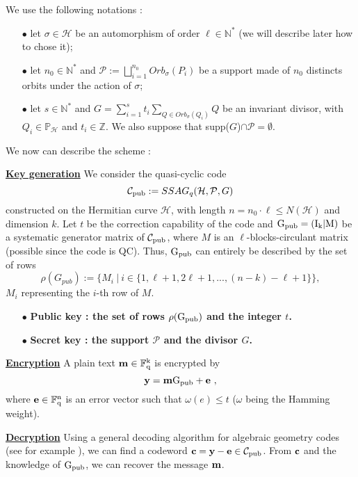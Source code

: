 \documentclass[10pt]{article}
\newcommand{\s}{\vspace{0.3cm}}
\newcommand{\cd}{\cdot}
\newcommand{\N}{\mathbb{N}}
\newcommand{\Z}{\mathbb{Z}}
\newcommand{\PP}{\mathbb{P}}
\newcommand{\fq}{\mathbb{F}_q}
\newcommand{\w}{\omega}
\newcommand{\PR}{\mathcal{P}}
\begin{document}
\s

We use the following notations : 
\begin{enumerate}
\item[$\bullet$] let $\sigma \in \mathcal{H}$ be an automorphism of order $\ell \in \N^*$ (we will describe later how to chose it);
\item[$\bullet$] let $n_0 \in \N^* $ and $\PR := \bigsqcup\limits_{i=1}^{n_0} Orb_{\sigma}(P_i)$ be a support made of $n_0$ distincts orbits under the action of $\sigma$;
\item[$\bullet$] let $s \in \N^*$ and $G = \sum\limits_{i=1}^s t_i \sum\limits_{Q \in Orb_{\sigma}(Q_i)} Q$ be an invariant divisor, with $Q_i \in \PP_{\mathcal{H}}$ and $t_i \in \Z$. We also suppose that supp($G$)$\cap \PR = \emptyset$.
\end{enumerate}

We now can describe the scheme :

\s 

\underline{\bf{Key generation}} We consider the quasi-cyclic code 
\[\mathcal{C}_{\rm pub} := SSAG_q(\mathcal{H},\PR,G)\]
constructed on the Hermitian curve $\mathcal{H}$, with length $n=n_0 \cd \ell\leq N(\mathcal{H})$ and dimension $k$. Let $t$ be the correction capability of the code and $\rm G_{pub} = (I_k | M)$ be a systematic generator matrix of $\mathcal{C}_{\rm pub}$, where $M$ is an $\ell$-blocks-circulant matrix (possible since the code is QC). Thus, $\rm G_{pub}$ can entirely be described by the set of rows
\[\rho(G_{pub}) := \{M_i \ | \ i \in \{1,\ell+1,2\ell+1,...,(n-k)-\ell+1\}\},\]
$M_i$ representing the $i$-th row of $M$. 

\begin{enumerate}
\item[$\bullet$] \bf{Public key} : \rm the set of rows $\rho(\rm G_{pub})$ and the integer $t$.
\item[$\bullet$] \bf{Secret key} : \rm the support $\PR$ and the divisor $G$.
\end{enumerate}

\s

\underline{\bf{Encryption}} A plain text $\bf{m} \rm \in \fq^k$ is encrypted by 
\[ \bf{y} \rm = \bf{m} \it \rm G_{pub} \it + \bf{e} \ ,\]
where $\bf{e} \rm \in \fq^n$ is an error vector such that $\w(e) \leq t$ ($\w$ being the Hamming weight).

\s

\underline{\bf{Decryption}} Using a general decoding algorithm for algebraic geometry codes (see for example \cite{THRP}), we can find a codeword $\bf{c} \rm = \rm \bf{y - e} \rm \in \mathcal{C}_{\rm pub}$. From $\bf{c}$ and the knowledge of $\rm G_{pub}$, we can recover the message $\bf{m}$.
\end{document}
